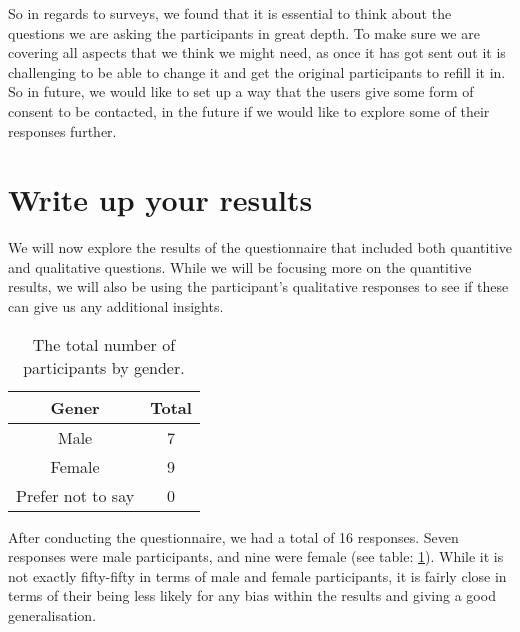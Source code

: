 \documentclass{sigchi}
\begin{document}
	So in regards to surveys, we found that it is essential to think about the questions we are asking the participants in great depth. To make sure we are covering all aspects that we think we might need, as once it has got sent out it is challenging to be able to change it and get the original participants to refill it in. So in future, we would like to set up a way that the users give some form of consent to be contacted, in the future if we would like to explore some of their responses further.
	


\section{Write up your results}
	

	We will now explore the results of the questionnaire that included both quantitive and qualitative questions. While we will be focusing more on the quantitive results, we will also be using the participant's qualitative responses to see if these can give us any additional insights.

	\begin{table}[ht]
		\centering
		\small
		\begin{tabular}[t]{|c| c |}
			\hline
			Gener & Total  \\ 
			\hline
			Male & 7 \\ 
			\hline
			Female & 9  \\ 
			\hline
			Prefer not to say &  0\\
			\hline
		\end{tabular}
		\caption{The total number of participants by gender.}
		\label{tab:gender}
	\end{table}%


	After conducting the questionnaire, we had a total of 16 responses. Seven responses were male participants, and nine were female (see table: \ref{tab:gender}). While it is not exactly fifty-fifty in terms of male and female participants, it is fairly close in terms of their being less likely for any bias within the results and giving a good generalisation. 
	
\end{document}
